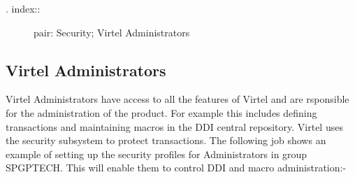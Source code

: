 \documentclass[letterpaper,10pt,english]{sphinxmanual}
\begin{document}
\begin{description}
\item[{. index::}] \leavevmode
pair: Security; Virtel Administrators

\end{description}


\subsection{Virtel Administrators}
\label{\detokenize{Installation_Guide:virtel-administrators}}
Virtel Administrators have access to all the features of Virtel and are rsponsible for the administration of the product. For example this includes defining transactions and maintaining macros in the DDI central repository. Virtel uses the security subsystem to protect transactions. The following job shows an example of setting up the security profiles for Administrators in group SPGPTECH. This will enable them to control DDI and macro administration:-
\end{document}
